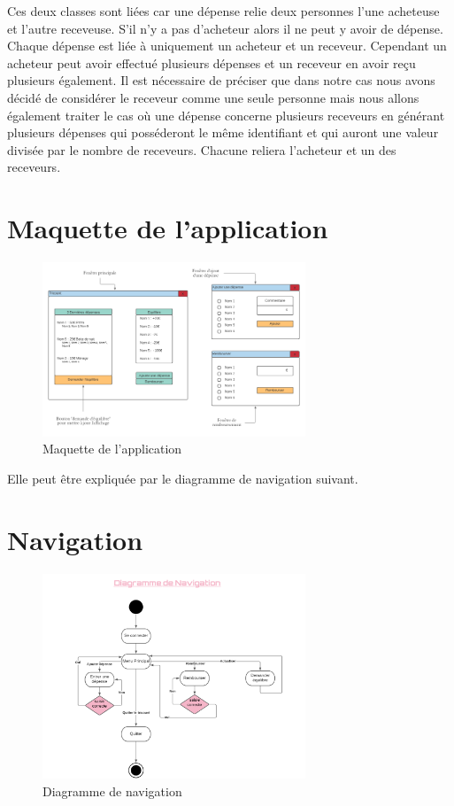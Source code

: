 \documentclass[12,french]{report}
\begin{document}
Ces deux classes sont liées car une dépense relie deux personnes l’une acheteuse et l’autre receveuse. S’il n’y a pas d’acheteur alors il ne peut y avoir de dépense. Chaque dépense est liée à uniquement un acheteur et un receveur. Cependant un acheteur peut avoir effectué plusieurs dépenses et un receveur en avoir reçu plusieurs également. 
Il est nécessaire de préciser que dans notre cas nous avons décidé de considérer le receveur comme une seule personne mais nous allons également traiter le cas où une dépense concerne plusieurs receveurs en générant plusieurs dépenses qui posséderont le même identifiant et qui auront une valeur divisée par le nombre de receveurs. Chacune reliera l’acheteur et un des receveurs. 

\section{Maquette de l'application}

\begin{figure}[H]
	\center
	\includegraphics[width=0.7\textwidth]{./Images/Maquette}
	\caption{Maquette de l'application}
\end{figure}\vspace{0.2cm}

Elle peut être expliquée par le diagramme de navigation suivant.

\section{Navigation}

\begin{figure}[H]
	\center
	\includegraphics[width=0.7\textwidth]{./Images/Navigation}
	\caption{Diagramme de navigation}
\end{figure}\vspace{0.2cm}
\end{document}
